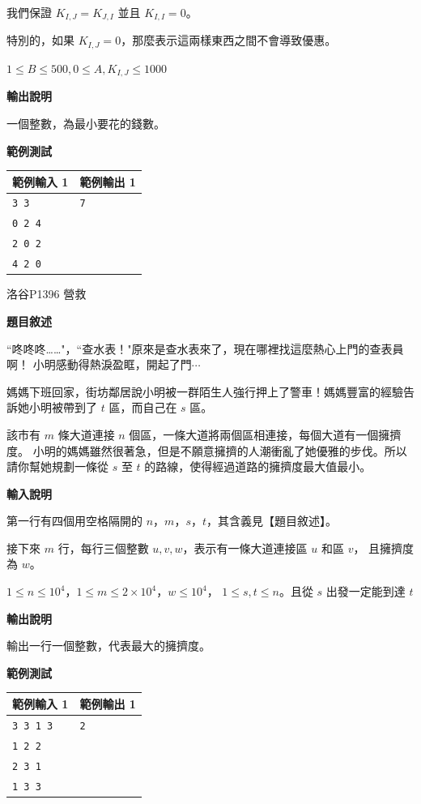     我們保證 $K_{I,J}=K_{J,I}$ 並且 $K_{I,I}=0$。

    特別的，如果 $K_{I,J}=0$，那麼表示這兩樣東西之間不會導致優惠。

    $1\le B\le500,0\le A,K_{I,J}\le1000$

    \textbf{輸出說明}

    一個整數，為最小要花的錢數。

    \textbf{範例測試}

    \begin{tabular}{|m{7cm}|m{7cm}|}
        \hline
        範例輸入 1 & 範例輸出 1 \\
        \hline
        \verb|3 3| & \verb|7| \\
        \verb|0 2 4| & \\
        \verb|2 0 2| & \\
        \verb|4 2 0| & \\
        \hline
    \end{tabular}

    \problem 洛谷P1396 營救

    \textbf{題目敘述}

    ``咚咚咚……"，``查水表！"原來是查水表來了，現在哪裡找這麼熱心上門的查表員啊！
    小明感動得熱淚盈眶，開起了門$\cdots$

    媽媽下班回家，街坊鄰居說小明被一群陌生人強行押上了警車！媽媽豐富的經驗告訴她小明被帶到了 
    $t$ 區，而自己在 $s$ 區。

    該市有 $m$ 條大道連接 $n$ 個區，一條大道將兩個區相連接，每個大道有一個擁擠度。
    小明的媽媽雖然很著急，但是不願意擁擠的人潮衝亂了她優雅的步伐。所以請你幫她規劃一條從
     $s$ 至 $t$ 的路線，使得經過道路的擁擠度最大值最小。

    \textbf{輸入說明}

    第一行有四個用空格隔開的 $n$，$m$，$s$，$t$，其含義見【題目敘述】。

    接下來 $m$ 行，每行三個整數 $u, v, w$，表示有一條大道連接區 $u$ 和區 $v$，
    且擁擠度為 $w$。

    $1 \leq n\leq 10^4$，$1 \leq m \leq 2 \times 10^4$，$w \leq 10^4$，
    $1 \leq s, t \leq n$。且從 $s$ 出發一定能到達 $t$

    \textbf{輸出說明}

    輸出一行一個整數，代表最大的擁擠度。

    \textbf{範例測試}

    \begin{tabular}{|m{7cm}|m{7cm}|}
        \hline
        範例輸入 1 & 範例輸出 1 \\
        \hline
        \verb|3 3 1 3| & \verb|2| \\
        \verb|1 2 2| & \\
        \verb|2 3 1| & \\
        \verb|1 3 3| & \\
        \hline
    \end{tabular}